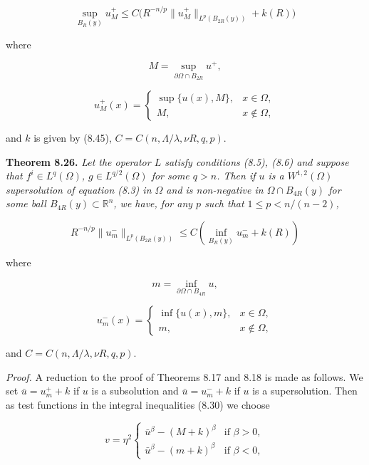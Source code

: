 \begin{equation}
\tag{8.69}
\sup_{B_R(y)} u_M^+ \le C\bigl(R^{-n/p}\|u_M^+\|_{L^p(B_{2R}(y))} + k(R)\bigr)
\end{equation}



where

\[
M = \sup_{\partial\Omega \cap B_{2R}} u^{+},
\]

\[
u^{+}_{M}(x)=
\begin{cases}
\sup \{u(x), M\}, & x \in \Omega,\\
M, & x \notin \Omega,
\end{cases}
\]

and $k$ is given by (8.45), $C = C(n,\Lambda/\lambda,\nu R,q,p)$.

\textbf{Theorem 8.26.} \textit{Let the operator $L$ satisfy conditions (8.5), (8.6) and suppose that
$f^i \in L^q(\Omega)$, $g \in L^{q/2}(\Omega)$ for some $q>n$. Then if $u$ is a $W^{1,2}(\Omega)$ supersolution of
equation (8.3) in $\Omega$ and is non-negative in $\Omega \cap B_{4R}(y)$ for some ball $B_{4R}(y)\subset \mathbb{R}^n$,
we have, for any $p$ such that $1 \le p < n/(n-2)$,}

\begin{equation}
R^{-n/p}\|u^{-}_{m}\|_{L^p(B_{2R}(y))} \le C\left(\inf_{B_R(y)} u^{-}_{m} + k(R)\right)
\tag{8.70}
\end{equation}

where

\[
m = \inf_{\partial\Omega \cap B_{4R}} u,
\]

\[
u^{-}_{m}(x)=
\begin{cases}
\inf \{u(x), m\}, & x \in \Omega,\\
m, & x \notin \Omega,
\end{cases}
\]

and $C = C(n,\Lambda/\lambda,\nu R,q,p)$.

\textit{Proof.} A reduction to the proof of Theorems 8.17 and 8.18 is made as follows. We
set $\bar{u}=u^{+}_{m}+k$ if $u$ is a subsolution and $\bar{u}=u^{-}_{m}+k$ if $u$ is a supersolution. Then as
test functions in the integral inequalities (8.30) we choose

\begin{equation}
v=\eta^2
\begin{cases}
\bar{u}^{\beta}-(M+k)^{\beta} & \text{if } \beta>0,\\
\bar{u}^{\beta}-(m+k)^{\beta} & \text{if } \beta<0,
\end{cases}
\tag{8.71}
\end{equation}

